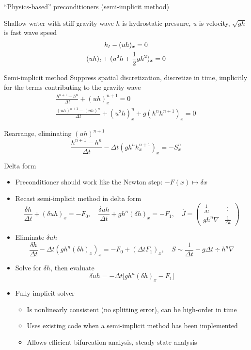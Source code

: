 \begin{frame}[shrink=10]{``Physics-based'' preconditioners (semi-implicit method)}
  \begin{block}{Shallow water with stiff gravity wave}
    $h$ is hydrostatic pressure, $u$ is velocity, $\sqrt{gh}$ is fast wave speed
    \begin{gather*}
      h_t - (uh)_x = 0 \\
      (uh)_t + (u^2h + {\frac 1 2} gh^2)_x = 0
    \end{gather*}
  \end{block}
  \vspace{-3em}
  \begin{block}{Semi-implicit method}
    Suppress spatial discretization, discretize in time, implicitly for the terms contributing to the gravity wave
    \begin{gather*}
      \frac{h^{n+1} - h^n}{\Delta t} + (uh)_x^{n+1} = 0 \\
      \frac{(uh)^{n+1} - (uh)^{n}}{\Delta t} + (u^2h)_x^{n} + g(h^n h^{n+1})_x = 0
    \end{gather*}

    Rearrange, eliminating $(uh)^{n+1}$
    \[ \frac{h^{n+1} - h^n}{\Delta t} - \Delta t(gh^n h_x^{n+1})_x = -S_x^n \]
  \end{block}
\end{frame}

\begin{frame}[shrink=1]{Delta form}
  \begin{itemize}
  \item Preconditioner should work like the Newton step: $-F(x) \mapsto \delta x$
  \item Recast semi-implicit method in delta form
    \[ \frac{\delta h}{\Delta t} + (\delta uh)_x = -F_0, \quad \frac{\delta uh}{\Delta t} + g h^n (\delta h)_x = -F_1,
    \quad \widehat{J} =
    \begin{pmatrix}
      \frac{1}{\Delta t} & \div \\
      g h^n \nabla & \frac{1}{\Delta t}
    \end{pmatrix}
    \]
  \item Eliminate $\delta uh$
    \[ \frac{\delta h}{\Delta t} - \Delta t(gh^n (\delta h)_x)_x = -F_0 + (\Delta t F_1)_x,
    \quad S \sim \frac{1}{\Delta t} - g \Delta t \div h^n \nabla
    \]
  \item Solve for $\delta h$, then evaluate
    \[ \delta uh = - \Delta t \big[ gh^n (\delta h)_x - F_1 \big] \]
  \item Fully implicit solver
    \begin{itemize}
    \item Is nonlinearly consistent (no splitting error), can be high-order in time
    \item Uses existing code when a semi-implicit method has been implemented
    \item Allows efficient bifurcation analysis, steady-state analysis
    \end{itemize}
  \end{itemize}
\end{frame}
